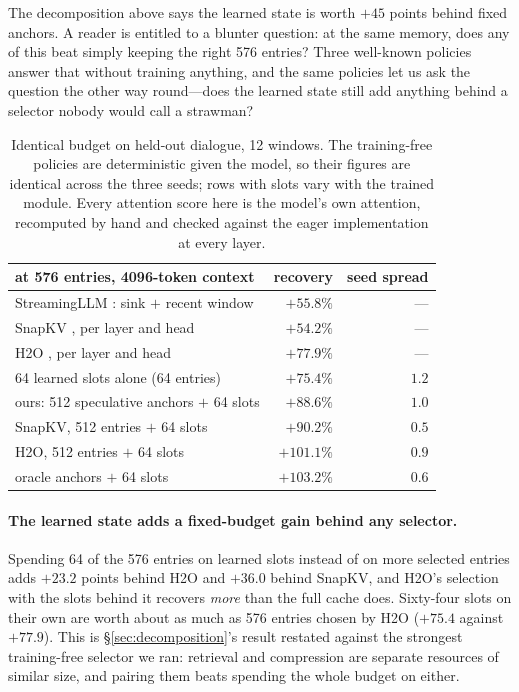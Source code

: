 \documentclass[11pt]{article}
\begin{document}
The decomposition above says the learned state is worth $+45$ points behind
fixed anchors. A reader is entitled to a blunter question: at the same memory,
does any of this beat simply keeping the right 576 entries? Three well-known
policies answer that without training anything, and the same policies let us ask
the question the other way round---does the learned state still add anything
behind a selector nobody would call a strawman?

\begin{table}[ht]
\centering
\small
\begin{tabular}{lrr}
\toprule
at 576 entries, 4096-token context & recovery & seed spread \\
\midrule
StreamingLLM \citep{streamingllm}: sink $+$ recent window & $+55.8\%$ & --- \\
SnapKV \citep{snapkv}, per layer and head                 & $+54.2\%$ & --- \\
H2O \citep{h2o}, per layer and head                       & $+77.9\%$ & --- \\
64 learned slots alone (64 entries)                       & $+75.4\%$ & $1.2$ \\
\midrule
ours: 512 speculative anchors $+$ 64 slots                & $+88.6\%$ & $1.0$ \\
SnapKV, 512 entries $+$ 64 slots                          & $+90.2\%$ & $0.5$ \\
H2O, 512 entries $+$ 64 slots                             & $\mathbf{+101.1\%}$ & $0.9$ \\
\midrule
oracle anchors $+$ 64 slots                               & $+103.2\%$ & $0.6$ \\
\bottomrule
\end{tabular}
\caption{Identical budget on held-out dialogue, 12 windows. The training-free
policies are deterministic given the model, so their figures are identical
across the three seeds; rows with slots vary with the trained module. Every
attention score here is the model's own attention, recomputed by hand and
checked against the eager implementation at every layer.}
\label{tab:baselines}
\end{table}

\paragraph{The learned state adds a fixed-budget gain behind any selector.}
Spending 64 of the 576 entries on learned slots instead of on more selected
entries adds $+23.2$ points behind H2O and $+36.0$ behind SnapKV, and H2O's
selection with the slots behind it recovers \emph{more} than the full cache does.
Sixty-four slots on their own are worth about as much as 576 entries chosen by
H2O ($+75.4$ against $+77.9$). This is \S\ref{sec:decomposition}'s result
restated against the strongest training-free selector we ran: retrieval and
compression are separate resources of similar size, and pairing them beats
spending the whole budget on either.
\end{document}
